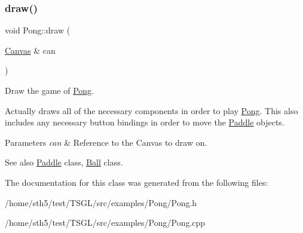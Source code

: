 \subsubsection{\texorpdfstring{draw()}{draw()}}
{\footnotesize\ttfamily void Pong\+::draw (\begin{DoxyParamCaption}\item[{\hyperlink{classtsgl_1_1_canvas}{Canvas} \&}]{can }\end{DoxyParamCaption})}



Draw the game of \hyperlink{class_pong}{Pong}. 

Actually draws all of the necessary components in order to play \hyperlink{class_pong}{Pong}. This also includes any necessary button bindings in order to move the \hyperlink{class_paddle}{Paddle} objects. 
\begin{DoxyParams}{Parameters}
{\em can} & Reference to the Canvas to draw on. \\
\hline
\end{DoxyParams}
\begin{DoxySeeAlso}{See also}
\hyperlink{class_paddle}{Paddle} class, \hyperlink{class_ball}{Ball} class. 
\end{DoxySeeAlso}


The documentation for this class was generated from the following files\+:\begin{DoxyCompactItemize}
\item 
/home/sth5/test/\+T\+S\+G\+L/src/examples/\+Pong/Pong.\+h\item 
/home/sth5/test/\+T\+S\+G\+L/src/examples/\+Pong/Pong.\+cpp\end{DoxyCompactItemize}
